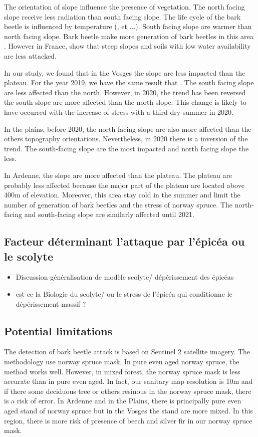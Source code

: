 \documentclass[3p,procedia]{elsarticle}
\begin{document}
The orientation of slope influence the presence of vegetation. The north facing slope receive less radiation than south facing slope. 
The life cycle of the bark beetle is influenced by temperature (\cite{baier_phenipscomprehensive_2007}, et ...). South facing slope are warmer than north facing slope.
Bark beetle make more generation of bark beetles in this area \cite{}. 
However in France, \cite{nardi_drought_2022} show that steep slopes and soils with low water availability are less attacked. 

In our study, we found that in the Vosges the slope are less impacted than the plateau. 
For the year 2019, we have the same result that \cite{nardi_drought_2022}. 
The south facing slope are less affected than the north. 
However, in 2020, the trend has been reversed the south slope are more affected than the north slope. 
This change is likely to have occurred with the increase of stress with a third dry summer in 2020.

In the plains, before 2020, the north facing slope are also more affected than the others topography orientations. 
Nevertheless, in 2020 there is a inversion of the trend. 
The south-facing slope are the most impacted and north facing slope the less.

In Ardenne, the slope are more affected than the plateau. The plateau are probably less affected because the major part of the plateau are located above 400m of elevation.
Moreover, this area stay cold in the summer and limit the number of generation of bark beetles and the stress of norway spruce.
The north-facing and south-facing slope are similarly affected until 2021. 


 

\subsection{Facteur déterminant l'attaque par l'épicéa ou le scolyte}

\begin{itemize}
	\item Discussion généralisation de modèle scolyte/ dépérissement des épicéas
    \item est ce la Biologie du scolyte/ ou le stress de l'épicéa qui conditionne le dépérissement massif ?
	
\end{itemize}

\subsection{Potential limitations}
The detection of bark beetle attack is based on Sentinel 2 satellite imagery.
The methodology use norway spruce mask. 
In pure even aged norway spruce, the method works well. 
However, in mixed forest, the norway spruce mask is less accurate than in pure even aged.
In fact, our sanitary map resolution is 10m and if there some deciduous tree or others resinous in the norway spruce mask, there is a risk of error.
In Ardenne and in the Plains, there is principally pure even aged stand of norway spruce but in the Vosges the stand are more mixed.
In this region, there is more risk of presence of beech and silver fir in our norway spruce mask.
\end{document}
